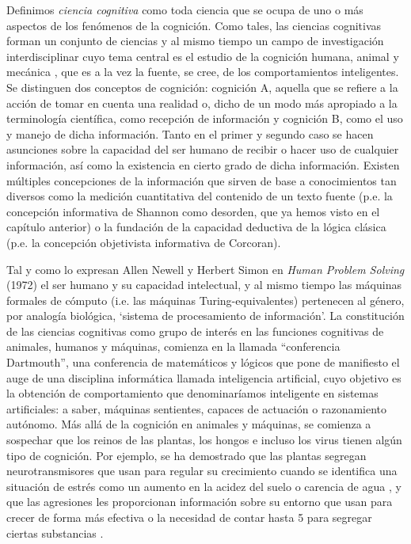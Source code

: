 \documentclass[12pt]{memoir}
\begin{document}
\begin{appendices}
Definimos \textit{ciencia cognitiva} como toda ciencia que se ocupa de uno o más aspectos de los fenómenos de la cognición. Como tales, las ciencias cognitivas forman un conjunto de ciencias y al mismo tiempo un campo de investigación interdisciplinar cuyo tema central es el estudio de la cognición humana, animal y mecánica \parencite[p.20]{pmf07}, que es a la vez la fuente, se cree, de los comportamientos inteligentes. Se distinguen dos conceptos de cognición: cognición A, aquella que se refiere a la acción de tomar en cuenta una realidad o, dicho de un modo más apropiado a la terminología científica, como recepción de información y cognición B, como el uso y manejo de dicha información. Tanto en el primer y segundo caso se hacen asunciones sobre la capacidad del ser humano de recibir o hacer uso de cualquier información, así como la existencia en cierto grado de dicha información. Existen múltiples concepciones de la información que sirven de base a conocimientos tan diversos como la medición cuantitativa del contenido de un texto fuente (p.e. la concepción informativa de Shannon como desorden, que ya hemos visto en el capítulo anterior) o la fundación de la capacidad deductiva de la lógica clásica (p.e. la concepción objetivista informativa de Corcoran).

Tal y como lo expresan Allen Newell y Herbert Simon en \textit{Human Problem Solving}
(1972) el ser humano y su capacidad intelectual, y al mismo tiempo las máquinas formales de cómputo (i.e. las máquinas Turing-equivalentes) pertenecen al género, por analogía biológica, `sistema de procesamiento de información'. La constitución de las ciencias cognitivas como grupo de interés en las funciones cognitivas de animales, humanos y máquinas, comienza en la llamada ``conferencia Dartmouth'', una conferencia de matemáticos y lógicos que pone de manifiesto el auge de una disciplina informática llamada inteligencia artificial, cuyo objetivo es la obtención de comportamiento que denominaríamos inteligente en sistemas artificiales: a saber, máquinas sentientes, capaces de actuación o razonamiento autónomo. Más allá de la cognición en animales y máquinas, se comienza a sospechar que los reinos de las plantas, los hongos e incluso los virus tienen algún tipo de cognición. Por ejemplo, se ha demostrado que las plantas segregan neurotransmisores que usan para regular su crecimiento cuando se identifica una situación de estrés como un aumento en la acidez del suelo o carencia de agua \parencite{plants}, y que las agresiones les proporcionan información sobre su entorno que usan para crecer de forma más efectiva o la necesidad de contar hasta 5 para segregar ciertas substancias \parencite{plantCognition}.


\end{appendices}
\end{document}
